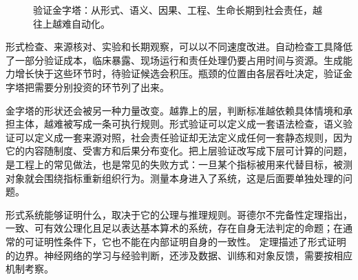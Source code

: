 \begin{figure}[ht]


\caption{验证金字塔：从形式、语义、因果、工程、生命长期到社会责任，越往上越难自动化。}
\label{fig:verification-pyramid}
\end{figure}

形式检查、来源核对、实验和长期观察，可以以不同速度改进。自动检查工具降低了一部分验证成本，临床暴露、现场运行和责任处理仍要占用时间与资源。生成能力增长快于这些环节时，待验证候选会积压。瓶颈的位置由各层吞吐决定，验证金字塔把需要分别投资的环节列了出来。

金字塔的形状还会被另一种力量改变。越靠上的层，判断标准越依赖具体情境和承担主体，越难被写成一条可执行规则。形式验证可以定义成一套语法检查，语义验证可以定义成一套来源对照，社会责任验证却无法定义成任何一套静态规则，因为它的内容随制度、受害方和后果分布变化。把上层验证改写成下层可计算的问题，是工程上的常见做法，也是常见的失败方式：一旦某个指标被用来代替目标，被测对象就会围绕指标重新组织行为。测量本身进入了系统，这是后面要单独处理的问题。


形式系统能够证明什么，取决于它的公理与推理规则。哥德尔不完备性定理指出，一致、可有效公理化且足以表达基本算术的系统，存在自身无法判定的命题；在通常的可证明性条件下，它也不能在内部证明自身的一致性。\cite{godel1931} 定理描述了形式证明的边界。神经网络的学习与经验判断，还涉及数据、训练和对象反馈，需要按相应机制考察。

